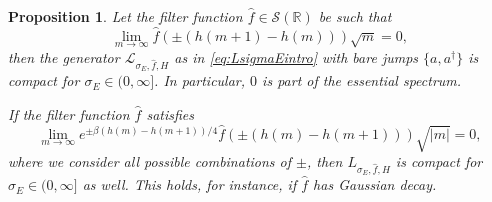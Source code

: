 \documentclass[11pt]{amsart}
\newcommand{\1}{\mathbbm{1}}
\newcommand{\R}{\mathbb{R}}
\theoremstyle{plain}
\newtheorem{proposition}[theorem]{Proposition}
\theoremstyle{definition}
\theoremstyle{remark}
\numberwithin{equation}{section}
\begin{document}
\begin{proposition}\label{prop.no-gogap}
    Let the filter function $\widehat{f}\in\mathcal{S}(\R)$ be such that
    \[\lim_{m \to \infty} \widehat{f}(\pm (h(m+1)-h(m))) \sqrt{m}=0,\]
    then the generator $\mathcal{L}_{\sigma_E,\widehat{f},H}$ as in \eqref{eq:LsigmaEintro}  with bare jumps $\{a,a^\dagger\}$ is compact for $\sigma_E \in (0,\infty]$. In particular, $0$ is part of the essential spectrum.

    
      If the filter function $\widehat{f}$ satisfies 
    \[ \lim_{m \to \infty} e^{\pm \beta (h(m)-h(m+1))/4}\widehat{f}(\pm ( h(m)-h(m+1))) \sqrt{|m|}=0,\]
    where we consider all possible combinations of $\pm$, then $L_{\sigma_E,\widehat{f},H}$ is compact for $\sigma_E \in (0,\infty]$ as well.
 This holds, for instance, if $\widehat{f}$ has Gaussian decay. 
\end{proposition}
\end{document}
